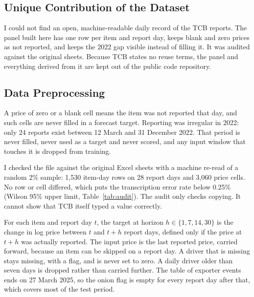 \subsection{Unique Contribution of the Dataset}
I could not find an open, machine-readable daily record of the TCB reports. The panel built here has one row per item and report day, keeps blank and zero prices as not reported, and keeps the 2022 gap visible instead of filling it. It was audited against the original sheets. Because TCB states no reuse terms, the panel and everything derived from it are kept out of the public code repository.

\subsection{Data Preprocessing}
A price of zero or a blank cell means the item was not reported that day, and such cells are never filled in a forecast target. Reporting was irregular in 2022: only 24 reports exist between 12 March and 31 December 2022. That period is never filled, never used as a target and never scored, and any input window that touches it is dropped from training.

I checked the file against the original Excel sheets with a machine re-read of a random 2\% sample: 1,530 item-day rows on 28 report days and 3,060 price cells. No row or cell differed, which puts the transcription error rate below 0.25\% (Wilson 95\% upper limit, Table~\ref{tab:audit}). The audit only checks copying. It cannot show that TCB itself typed a value correctly.

\begin{table}[H]\centering\small
\caption[Audit of the price file against the TCB sheets]{Audit of the price file against the original TCB sheets.}\label{tab:audit}

\par{}
\end{table}

For each item and report day $t$, the target at horizon $h \in \{1,7,14,30\}$ is the change in log price between $t$ and $t+h$ report days, defined only if the price at $t+h$ was actually reported. The input price is the last reported price, carried forward, because an item can be skipped on a report day. A driver that is missing stays missing, with a flag, and is never set to zero. A daily driver older than seven days is dropped rather than carried further. The table of exporter events ends on 27 March 2025, so the onion flag is empty for every report day after that, which covers most of the test period.

